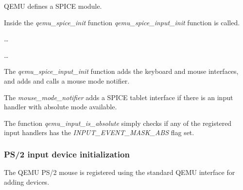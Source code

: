 QEMU defines a SPICE module.

\begin{codeblock}
    
\end{codeblock}

Inside the \emph{qemu\_spice\_init} function \emph{qemu\_spice\_input\_init}
function is called.

\begin{codeblock}
    
    \dots
    
    \dots
    
\end{codeblock}

The \emph{qemu\_spice\_input\_init} function adds the keyboard and mouse
interfaces, and adds and calls a mouse mode notifier.

\begin{codeblock}
    
\end{codeblock}

The \emph{mouse\_mode\_notifier} adds a SPICE tablet interface if there is an
input handler with absolute mode available.

\begin{codeblock}
    
\end{codeblock}

The function \emph{qemu\_input\_is\_absolute} simply checks if any of the
registered input handlers has the \emph{INPUT\_EVENT\_MASK\_ABS} flag set.

\begin{codeblock}
    
\end{codeblock}

\subsubsection{PS/2 input device initialization}

The QEMU PS/2 mouse is registered using the standard QEMU interface for adding
devices.

